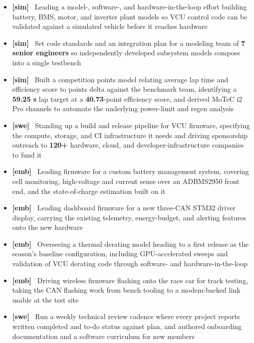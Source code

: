 \documentclass[10pt,letterpaper]{article}
\newcommand{\vtag}[1]{\textbf{[#1]}~}
\begin{document}
\begin{itemize}
  \item \vtag{sim} Leading a model-, software-, and hardware-in-the-loop effort building battery, BMS, motor, and inverter plant models so VCU control code can be validated against a simulated vehicle before it reaches hardware
  \item \vtag{sim} Set code standards and an integration plan for a modeling team of \textbf{7 senior engineers} so independently developed subsystem models compose into a single testbench
  \item \vtag{sim} Built a competition points model relating average lap time and efficiency score to points delta against the benchmark team, identifying a \textbf{59.25 s} lap target at a \textbf{40.73}-point efficiency score, and derived MoTeC i2 Pro channels to automate the underlying power-limit and regen analysis
  \item \vtag{swe} Standing up a build and release pipeline for VCU firmware, specifying the compute, storage, and CI infrastructure it needs and driving sponsorship outreach to \textbf{120+} hardware, cloud, and developer-infrastructure companies to fund it
  \item \vtag{emb} Leading firmware for a custom battery management system, covering cell monitoring, high-voltage and current sense over an ADBMS2950 front end, and the state-of-charge estimation built on it
  \item \vtag{emb} Leading dashboard firmware for a new three-CAN STM32 driver display, carrying the existing telemetry, energy-budget, and alerting features onto the new hardware
  \item \vtag{emb} Overseeing a thermal derating model heading to a first release as the season's baseline configuration, including GPU-accelerated sweeps and validation of VCU derating code through software- and hardware-in-the-loop
  \item \vtag{emb} Driving wireless firmware flashing onto the race car for track testing, taking the CAN flashing work from bench tooling to a modem-backed link usable at the test site
  \item \vtag{swe} Run a weekly technical review cadence where every project reports written completed and to-do status against plan, and authored onboarding documentation and a software curriculum for new members
\end{itemize}

\entryspace
\end{document}
